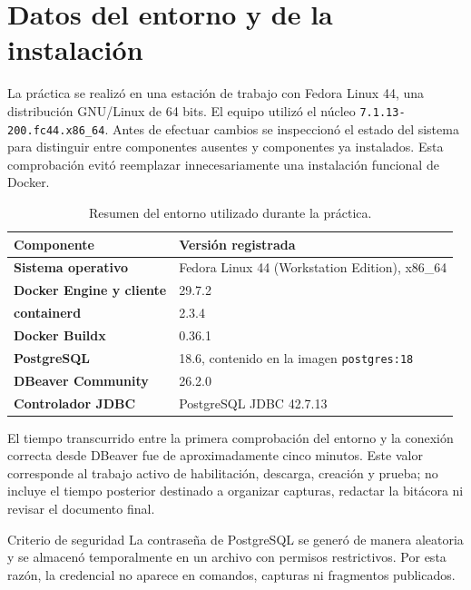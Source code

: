 \section{Datos del entorno y de la instalación}

La práctica se realizó en una estación de trabajo con Fedora Linux 44, una
distribución GNU/Linux de 64 bits. El equipo utilizó el núcleo
\texttt{7.1.13-200.fc44.x86\_64}. Antes de efectuar cambios se inspeccionó el
estado del sistema para distinguir entre componentes ausentes y componentes ya
instalados. Esta comprobación evitó reemplazar innecesariamente una
instalación funcional de Docker.

\begin{table}[H]
  \centering
  \begin{tabularx}{\textwidth}{>{\bfseries}lX}
    \toprule
    Componente & Versión registrada \\
    \midrule
    Sistema operativo & Fedora Linux 44 (Workstation Edition), x86\_64 \\
    Docker Engine y cliente & 29.7.2 \\
    containerd & 2.3.4 \\
    Docker Buildx & 0.36.1 \\
    PostgreSQL & 18.6, contenido en la imagen \texttt{postgres:18} \\
    DBeaver Community & 26.2.0 \\
    Controlador JDBC & PostgreSQL JDBC 42.7.13 \\
    \bottomrule
  \end{tabularx}
  \caption{Resumen del entorno utilizado durante la práctica.}
\end{table}


El tiempo transcurrido entre la primera comprobación del entorno y la conexión
correcta desde DBeaver fue de aproximadamente cinco minutos. Este valor
corresponde al trabajo activo de habilitación, descarga, creación y prueba; no
incluye el tiempo posterior destinado a organizar capturas, redactar la
bitácora ni revisar el documento final.

\begin{nota}{Criterio de seguridad}
La contraseña de PostgreSQL se generó de manera aleatoria y se almacenó
temporalmente en un archivo con permisos restrictivos. Por esta razón, la
credencial no aparece en comandos, capturas ni fragmentos publicados.
\end{nota}
